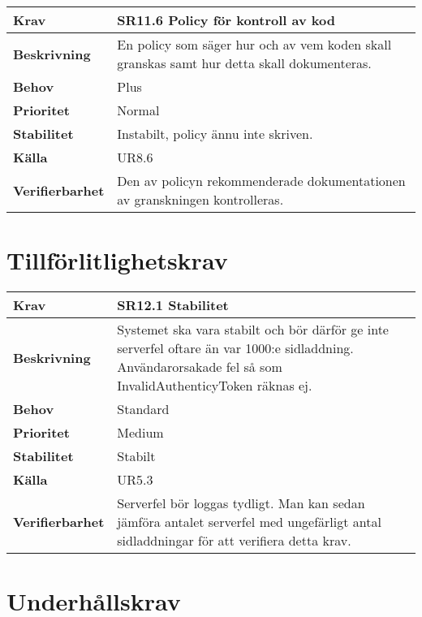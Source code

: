 \documentclass[a4paper, twoside, 11pt, titlepage]{article}
\begin{document}
\begin{tabular} { p{2.6cm} p{12.5cm} }
	\hline
	\sffamily\textbf{Krav} & \sffamily\textbf{SR11.6 Policy för kontroll av kod  } \\
	\hline
	\sffamily\textbf{Beskrivning} &  En policy som säger hur och av vem koden skall granskas samt hur detta skall dokumenteras.   \\
	\hline
	\sffamily\textbf{Behov} &  Plus  \\
	\hline
	\sffamily\textbf{Prioritet} &  Normal   \\
	\hline
	\sffamily\textbf{Stabilitet} &  Instabilt, policy ännu inte skriven.   \\
	\hline
	\sffamily\textbf{Källa} &  UR8.6   \\
	\hline
	\sffamily\textbf{Verifierbarhet} &  Den av policyn rekommenderade dokumentationen av granskningen kontrolleras.   \\
	\hline
\end{tabular}


\clearpage
\section{Tillförlitlighetskrav}


\begin{tabular} { p{2.6cm} p{12.5cm} }
	\hline
	\sffamily\textbf{Krav} & \sffamily\textbf{SR12.1 Stabilitet } \\
	\hline
	\sffamily\textbf{Beskrivning} & Systemet ska vara stabilt och bör därför ge inte serverfel oftare än var 1000:e sidladdning. Användarorsakade fel så som InvalidAuthenticyToken räknas ej.  \\
	\hline
	\sffamily\textbf{Behov} & Standard  \\
	\hline
	\sffamily\textbf{Prioritet} & Medium  \\
	\hline
	\sffamily\textbf{Stabilitet} & Stabilt  \\
	\hline
	\sffamily\textbf{Källa} & UR5.3  \\
	\hline
	\sffamily\textbf{Verifierbarhet} & Serverfel bör loggas tydligt. Man kan sedan jämföra antalet serverfel med ungefärligt antal sidladdningar för att verifiera detta krav.  \\
	\hline
\end{tabular}


\clearpage
\section{Underhållskrav}
\end{document}

